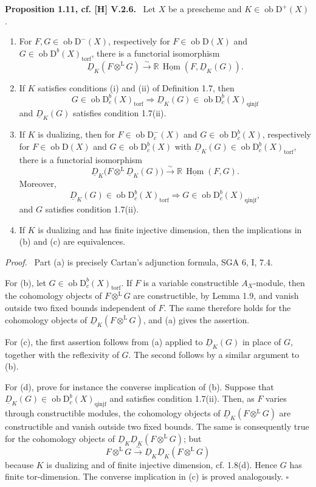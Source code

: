 \documentclass[11pt]{article}
\providecommand{\qedtext}{\hfill$\square$}
\newenvironment{statement}[1]{\par\medskip\noindent\textbf{#1.}\ }{\par\medskip}
\newenvironment{prooftext}[1][Proof]{\par\noindent\emph{#1.}\ }{\par\medskip}
\DeclareMathOperator{\Hom}{Hom}
\newcommand{\D}{\mathrm{D}}
\newcommand{\ob}{\operatorname{ob}}
\providecommand{\Hom}{\operatorname{Hom}}
\providecommand{\ob}{\operatorname{ob}}
\providecommand{\Hom}{\operatorname{Hom}}
\providecommand{\qedtext}{\hfill$\square$}
\begin{document}
\begin{statement}{Proposition 1.11, cf. [H] V.2.6}
Let $X$ be a prescheme and $K\in\ob\D^+(X)$.
\begin{enumerate}[label=\alph*)]
\item For $F,G\in\ob\D^-(X)$, respectively for $F\in\ob\D(X)$ and $G\in\ob\D^b(X)_{\mathrm{torf}}$, there is a functorial isomorphism
\[
   \underline D_K(F\otimes^{\mathrm L}G)\xrightarrow{\sim}
   \mathbb{R}\,\underline{\Hom}(F,\underline D_K(G)).
\]

\item If $K$ satisfies conditions (i) and (ii) of Definition 1.7, then
\[
   G\in\ob\D_c^b(X)_{\mathrm{torf}}
   \Longrightarrow
   \underline D_K(G)\in\ob\D_c^b(X)_{\mathrm{qinjf}}
\]
and $\underline D_K(G)$ satisfies condition 1.7(ii).

\item If $K$ is dualizing, then for $F\in\ob\D_c^-(X)$ and $G\in\ob\D_c^b(X)$, respectively for $F\in\ob\D(X)$ and $G\in\ob\D_c^b(X)$ with $\underline D_K(G)\in\ob\D_c^b(X)_{\mathrm{torf}}$, there is a functorial isomorphism
\[
   \underline D_K\bigl(F\otimes^{\mathrm L}\underline D_K(G)\bigr)
      \xrightarrow{\sim}\mathbb{R}\,\underline{\Hom}(F,G).
\]
Moreover,
\[
   \underline D_K(G)\in\ob\D_c^b(X)_{\mathrm{torf}}
   \Longrightarrow
   G\in\ob\D_c^b(X)_{\mathrm{qinjf}},
\]
and $G$ satisfies condition 1.7(ii).

\item If $K$ is dualizing and has finite injective dimension, then the implications in (b) and (c) are equivalences.
\end{enumerate}
\end{statement}

\begin{prooftext}
Part (a) is precisely Cartan's adjunction formula, SGA 6, I, 7.4.

For (b), let $G\in\ob\D_c^b(X)_{\mathrm{torf}}$. If $F$ is a variable constructible $A_X$-module, then the cohomology objects of $F\otimes^{\mathrm L}G$ are constructible, by Lemma 1.9, and vanish outside two fixed bounds independent of $F$. The same therefore holds for the cohomology objects of $\underline D_K(F\otimes^{\mathrm L}G)$, and (a) gives the assertion.

For (c), the first assertion follows from (a) applied to $\underline D_K(G)$ in place of $G$, together with the reflexivity of $G$. The second follows by a similar argument to (b).

For (d), prove for instance the converse implication of (b). Suppose that $\underline D_K(G)\in\ob\D_c^b(X)_{\mathrm{qinjf}}$ and satisfies condition 1.7(ii). Then, as $F$ varies through constructible modules, the cohomology objects of $\underline D_K(F\otimes^{\mathrm L}G)$ are constructible and vanish outside two fixed bounds. The same is consequently true for the cohomology objects of $\underline D_K\underline D_K(F\otimes^{\mathrm L}G)$; but
\[
   F\otimes^{\mathrm L}G\xrightarrow{\sim}\underline D_K\underline D_K(F\otimes^{\mathrm L}G)
\]
because $K$ is dualizing and of finite injective dimension, cf. 1.8(d). Hence $G$ has finite tor-dimension. The converse implication in (c) is proved analogously. \qedtext
\end{prooftext}
\end{document}
